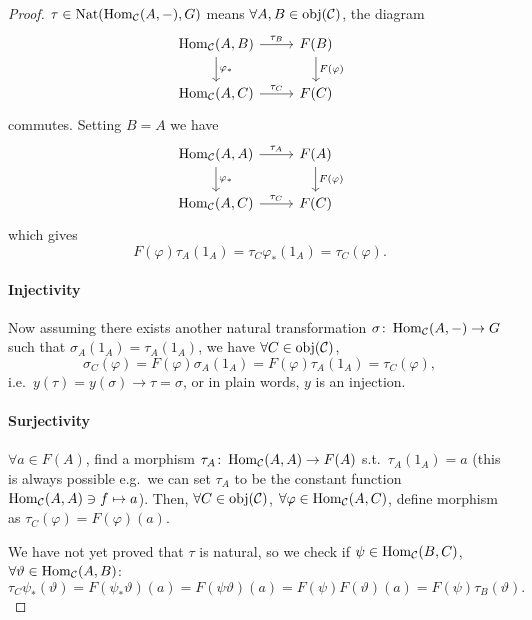 \documentclass[openany, a5paper]{book}
\begin{document}
\begin{proof}
	$\tau \in \operatorname{Nat}(\operatorname{Hom}_{\mathcal C}(A, -), G)$ means $\forall A, B \in \operatorname{obj}(\mathcal C)$, the diagram
	\begin{equation}
		\begin{tikzcd}
			{\Hom_{\mathcal C}(A, B)} \arrow[d, "\varphi_*"] \arrow[r, "\tau_B"] & F(B) \arrow[d, "F(\varphi)"] \\
			{\Hom_{\mathcal C}(A, C)} \arrow[r, "\tau_C"]                        & F(C)                          
		\end{tikzcd}
	\end{equation}
	commutes.
	Setting $B = A$ we have
	\begin{equation}
		\begin{tikzcd}
			{\Hom_{\mathcal C}(A, A)} \arrow[d, "\varphi_*"] \arrow[r, "\tau_A"] & F(A) \arrow[d, "F(\varphi)"] \\
			{\Hom_{\mathcal C}(A, C)} \arrow[r, "\tau_C"]                        & F(C)                          
		\end{tikzcd}
	\end{equation}
	which gives
	\begin{equation}
		F(\varphi) \tau_A(1_A) = \tau_C \varphi_*(1_A) = \tau_C(\varphi).
	\end{equation}

	\paragraph{Injectivity}
	Now assuming there exists another natural transformation $\sigma \colon \operatorname{Hom}_{\mathcal C}(A, -) \to G$ such that $\sigma_A(1_A) = \tau_A(1_A)$, we have $\forall C \in \operatorname{obj}(\mathcal C)$,
	\begin{equation}
		\sigma_C(\varphi) = F(\varphi) \sigma_A(1_A) = F(\varphi) \tau_A(1_A) = \tau_C(\varphi),
	\end{equation}
	i.e.\ $y(\tau) = y(\sigma) \to \tau = \sigma$, or in plain words, $y$ is an injection.

	\paragraph{Surjectivity}
	$\forall a \in F(A)$, find a morphism $\tau_A \colon \operatorname{Hom}_{\mathcal C}(A, A) \to F(A)$ s.t.\ $\tau_A(1_A) = a$ (this is always possible e.g.\ we can set $\tau_A$ to be the constant function $\operatorname{Hom}_{\mathcal C}(A, A) \ni f \mapsto a$).
	Then, $\forall C \in \operatorname{obj}(\mathcal C)$, $\forall \varphi \in \operatorname{Hom}_{\mathcal C}(A, C)$, define morphism as $\tau_C(\varphi) = F(\varphi)(a)$.

	We have not yet proved that $\tau$ is natural, so we check if $\psi \in \operatorname{Hom}_{\mathcal C}(B, C)$, $\forall \vartheta \in \operatorname{Hom}_{\mathcal C}(A, B)$:
	\begin{equation}
		\tau_C \psi_* (\vartheta) = F(\psi_* \vartheta) (a)
		= F(\psi \vartheta ) (a) = F(\psi)  F(\vartheta) (a)
		= F(\psi) \tau_B (\vartheta).
	\end{equation}
\end{proof}
\end{document}
